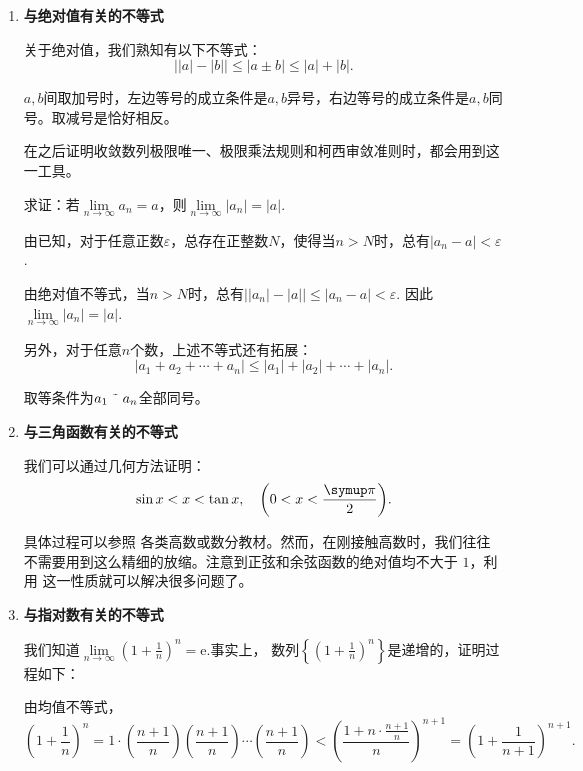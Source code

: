 \begin{enumerate}
    \item \textbf{与绝对值有关的不等式}

          关于绝对值，我们熟知有以下不等式：
          \[
              \big | \lvert a \rvert-\lvert b\rvert  \big |
              \leqslant \lvert a\pm b\rvert \leqslant \lvert a\rvert +\lvert b\rvert
              .\]

          $a,b$间取加号时，左边等号的成立条件是$a,b$异号，右边等号的成立条件是$a,b$同号。取减号是恰好相反。

          在之后证明收敛数列极限唯一、极限乘法规则和柯西审敛准则时，都会用到这一工具。
          \begin{example}
              求证：若$\lim\limits_{n \to \infty} a_n =a$，则$\lim\limits_{n \to \infty} |a_n| =|a|$.
          \end{example}
          \begin{prove}
              由已知，对于任意正数$\varepsilon$，总存在正整数$N$，使得当$n>N$时，总有$|a_n-a|<\varepsilon$.


              由绝对值不等式，当$n>N$时，总有$\big ||a_n|-|a|\big |\leqslant |a_n-a|<\varepsilon$.
              因此$\lim\limits_{n \to \infty} |a_n| =|a|$.
          \end{prove}
          另外，对于任意$n$个数，上述不等式还有拓展：
          \[
              |a_1+a_2+\cdots +a_n|\leqslant |a_1|+|a_2|+\cdots +|a_n|
              .\]

          取等条件为$a_1\mathrel{\char"007E}a_n$全部同号。
    \item \textbf{与三角函数有关的不等式}

          我们可以通过几何方法证明：
          \[
              \sin x<x<\tan x,\quad\left( 0<x<\frac{\symup\pi}{2} \right)
              .\]

          具体过程可以参照%
          各类高数或数分教材。然而，在刚接触高数时，我们往往不需要用到这么精细的放缩。注意到正弦和余弦函数的绝对值均不大于 $1$，利用
          这一性质就可以解决很多问题了。

    \item \textbf{与指对数有关的不等式}

          我们知道$\lim\limits_{n \to \infty}\left (1+\frac{1}{n}\right )^n=\mathrm e$.事实上，
          数列$\left\{ \left (1+\frac{1}{n}\right )^n  \right\} $是递增的，证明过程如下：
          \begin{prove}
              由均值不等式，
              \[
                  \left (1+\frac{1}{n}\right )^n=1\cdot \left (\frac{n+1}{n}\right )\left (\frac{n+1}{n}\right )
                  \cdots \left (\frac{n+1}{n}\right )<
                  \left (\frac{1+n\cdot \frac{n+1}{n}}{n}\right )^{n+1}=\left (1+\frac{1}{n+1}\right )^{n+1}
                  .\]
          \end{prove}



\end{enumerate}

